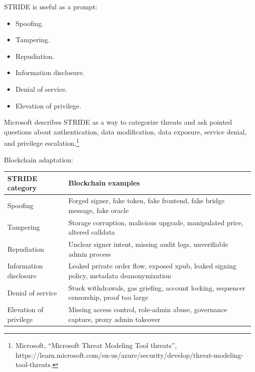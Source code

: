 STRIDE is useful as a prompt:

\begin{itemize}
\tightlist
\item
  Spoofing.
\item
  Tampering.
\item
  Repudiation.
\item
  Information disclosure.
\item
  Denial of service.
\item
  Elevation of privilege.
\end{itemize}

Microsoft describes STRIDE as a way to categorize threats and ask
pointed questions about authentication, data modification, data
exposure, service denial, and privilege escalation.\footnote{Microsoft,
  ``Microsoft Threat Modeling Tool threats'',
  https://learn.microsoft.com/en-us/azure/security/develop/threat-modeling-tool-threats.}

Blockchain adaptation:

{\def\LTcaptype{none} %
\begin{longtable}[]{@{}
  >{\raggedright\arraybackslash}p{}
  >{\raggedright\arraybackslash}p{}@{}}
\toprule\noalign{}
\begin{minipage}[b]{\linewidth}\raggedright
STRIDE category
\end{minipage} & \begin{minipage}[b]{\linewidth}\raggedright
Blockchain examples
\end{minipage} \\
\midrule\noalign{}
\endhead
\bottomrule\noalign{}
\endlastfoot
Spoofing & Forged signer, fake token, fake frontend, fake bridge
message, fake oracle \\
Tampering & Storage corruption, malicious upgrade, manipulated price,
altered calldata \\
Repudiation & Unclear signer intent, missing audit logs, unverifiable
admin process \\
Information disclosure & Leaked private order flow, exposed xpub, leaked
signing policy, metadata deanonymization \\
Denial of service & Stuck withdrawals, gas griefing, account locking,
sequencer censorship, proof too large \\
Elevation of privilege & Missing access control, role-admin abuse,
governance capture, proxy admin takeover \\
\end{longtable}
}

